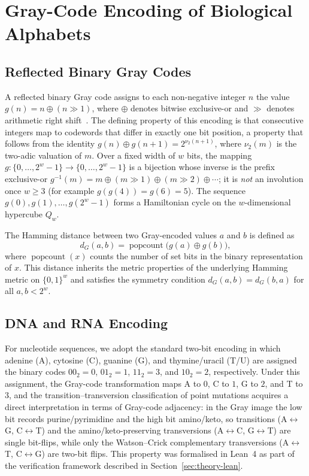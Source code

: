 \section{Gray-Code Encoding of Biological Alphabets}
\label{sec:theory-gray}

\subsection{Reflected Binary Gray Codes}
\label{sec:gray-def}

A reflected binary Gray code assigns to each non-negative integer $n$ the
value $g(n) = n \oplus (n \gg 1)$, where $\oplus$ denotes bitwise exclusive-or
and $\gg$ denotes arithmetic right shift~\cite{gray1953}.  The defining
property of this encoding is that consecutive integers map to codewords that
differ in exactly one bit position, a property that follows from the identity
$g(n) \oplus g(n{+}1) = 2^{\nu_2(n+1)}$, where $\nu_2(m)$ is the two-adic
valuation of $m$.  Over a fixed width of $w$ bits, the mapping $g : \{0,
	\ldots, 2^w{-}1\} \to \{0, \ldots, 2^w{-}1\}$ is a bijection whose inverse is the
prefix exclusive-or $g^{-1}(m) = m \oplus (m \gg 1) \oplus (m \gg 2) \oplus \cdots$; it is
\emph{not} an involution once $w \geq 3$ (for example $g(g(4)) = g(6) = 5$).  The
sequence $g(0), g(1), \ldots, g(2^w{-}1)$ forms a Hamiltonian cycle on the
$w$-dimensional hypercube $Q_w$.

The Hamming distance between two Gray-encoded values $a$ and $b$ is defined as
\begin{equation}
	d_G(a, b) = \operatorname{popcount}\!\bigl(g(a) \oplus g(b)\bigr),
	\label{eq:gray-hamming}
\end{equation}
where $\operatorname{popcount}(x)$ counts the number of set bits in the binary
representation of $x$.  This distance inherits the metric properties of the
underlying Hamming metric on $\{0,1\}^w$ and satisfies the symmetry condition
$d_G(a,b) = d_G(b,a)$ for all $a, b < 2^w$.

\subsection{DNA and RNA Encoding}
\label{sec:gray-dna}

For nucleotide sequences, we adopt the standard two-bit encoding in which
adenine (A), cytosine (C), guanine (G), and thymine/uracil (T/U) are assigned
the binary codes $00_2 = 0$, $01_2 = 1$, $11_2 = 3$, and $10_2 = 2$,
respectively.  Under this assignment, the Gray-code transformation maps A to
$0$, C to $1$, G to $2$, and T to $3$, and the transition--transversion
classification of point mutations acquires a direct interpretation in terms of
Gray-code adjacency: in the Gray image the low bit records purine/pyrimidine
and the high bit amino/keto, so transitions (A$\leftrightarrow$G,
C$\leftrightarrow$T) and the amino/keto-preserving transversions
(A$\leftrightarrow$C, G$\leftrightarrow$T) are single bit-flips, while only the
Watson--Crick complementary transversions (A$\leftrightarrow$T,
C$\leftrightarrow$G) are two-bit flips.  This property was formalised in
Lean~4 as part of the verification framework described in
Section~\ref{sec:theory-lean}.

